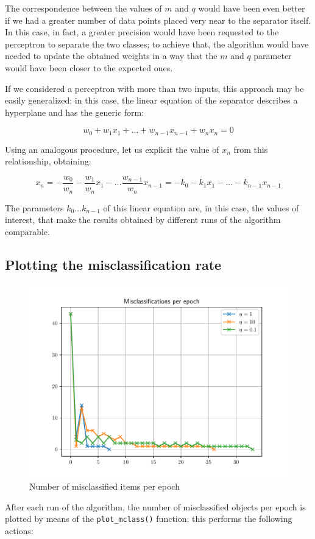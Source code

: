 \documentclass[letterpaper,headings=standardclasses]{scrartcl}
\begin{document}
The correspondence between the values of $m$ and $q$ would have been even better if we had a greater number of data points placed very near to the separator itself. In this case, in fact, a greater precision would have been requested to the perceptron to separate the two classes; to achieve that, the algorithm would have needed to update the obtained weights in a way that the $m$ and $q$ parameter would have been closer to the expected ones.

If we considered a perceptron with more than two inputs, this approach may be easily generalized; in this case, the linear equation of the separator describes a hyperplane and has the generic form:

$$ w_0 + w_1x_1 + \dots + w_{n-1}x_{n-1} + w_nx_n = 0 $$

Using an analogous procedure, let us explicit the value of $x_n$ from this relationship, obtaining:

$$ x_n = -\frac{w_0}{w_n} - \frac{w_1}{w_n}x_1 - \dots \frac{w_{n-1}}{w_n}x_{n-1} = - k_0 - k_1x_1 - \dots - k_{n-1}x_{n-1} $$

The parameters $k_0 \dots k_{n-1}$ of this linear equation are, in this case, the values of interest, that make the results obtained by different runs of the algorithm comparable.

\subsection{Plotting the misclassification rate}

\begin{figure}[h]
\centering
\includegraphics[width=.7\linewidth]{mclass_per_epoch.pdf}
\caption{Number of misclassified items per epoch}
\label{mclass_per_epoch}
\end{figure}

After each run of the algorithm, the number of misclassified objects per epoch is plotted by means of the \texttt{plot\_mclass()} function; this performs the following actions:
\end{document}
